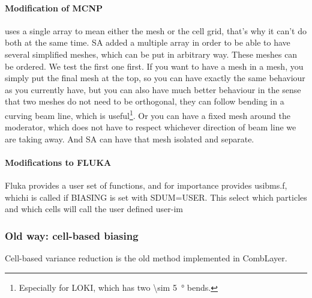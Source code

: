 \begin{description}
\paragraph{Modification of MCNP}
\mcnp uses a single array to mean either the mesh or the cell grid, that's why it can't do both at the same time.
SA added a multiple array in order to be able to have several simplified meshes, which can be put in arbitrary way.
These meshes can be ordered.
We test the first one first. If you want to have a mesh in a mesh, you simply put the final mesh at the top,
so you can have exactly the same behaviour as you currently have, but you can also have much better behaviour in the sense
that two meshes do not need to be orthogonal, they can follow bending in a curving beam line, which is useful\footnote{Especially for LOKI, which has two \SI{\sim 5}{\degree} bends.}.
Or you can have a fixed mesh around the moderator, which does not have to respect whichever direction of beam line we are taking away.
And SA can have that mesh isolated and separate.

\paragraph{Modifications to FLUKA}

Fluka provides a user set of functions, and for importance provides usibms.f,
whichi is called if BIASING is set with SDUM=USER. This select which particles
and which cells will call the user defined user-im

\subsubsection{Old way: cell-based biasing}
\label{sec:vr:cadis:cell}
Cell-based variance reduction is the old method implemented in CombLayer.




\end{description}
